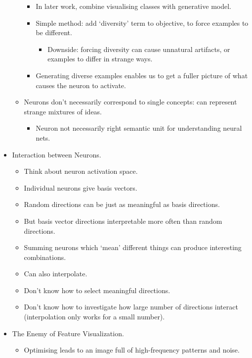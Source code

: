 \begin{itemize}
\begin{itemize}
\begin{itemize}
            \item In later work, combine visualising classes with generative model.
            \item Simple method: add `diversity' term to objective, to force examples to be different.
            \begin{itemize}
                \item Downside: forcing diversity can cause unnatural artifacts, or examples to differ in strange ways.
            \end{itemize}
            \item Generating diverse examples enables us to get a fuller picture of what causes the neuron to activate.
        \end{itemize}
        \item Neurons don't necessarily correspond to single concepts: can represent strange mixtures of ideas.
        \begin{itemize}
            \item Neuron not necessarily right semantic unit for understanding neural nets.
        \end{itemize}
    \end{itemize}
    \item Interaction between Neurons.
    \begin{itemize}
        \item Think about neuron activation space.
        \item Individual neurons give basis vectors.
        \item Random directions can be just as meaningful as basis directions.
        \item But basis vector directions interpretable more often than random directions.
        \item Summing neurons which `mean' different things can produce interesting combinations.
        \item Can also interpolate.
        \item Don't know how to select meaningful directions.
        \item Don't know how to investigate how large number of directions interact (interpolation only works for a small number).
    \end{itemize}
    \item The Enemy of Feature Visualization.
    \begin{itemize}
        \item Optimising leads to an image full of high-frequency patterns and noise.

\end{itemize}
\end{itemize}
